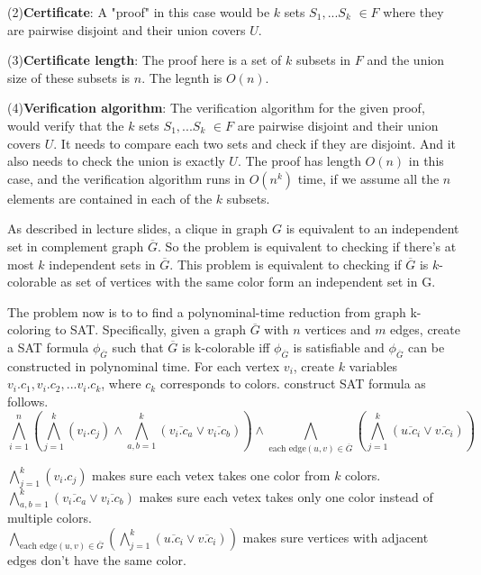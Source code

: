 \documentclass[12pt,a4paper]{article}
\newcommand{\question}[1]{\bigskip\noindent{\textbf{Q{#1} solution}}}
\begin{document}
(2)\textbf{Certificate}: A "proof" in this case would be $k$ sets $S_1, ... S_k$ $\in F$ where they are pairwise disjoint and their union covers $U$.

(3)\textbf{Certificate length}: The proof here is a set of $k$ subsets in $F$ and the union size of these subsets is $n$. The legnth is $O(n)$.

(4)\textbf{Verification algorithm}: The verification algorithm for the given proof, would verify that the $k$ sets $S_1, ... S_k$ $\in F$ are pairwise disjoint and their union covers $U$. It needs to compare each two sets and check if they are disjoint. And it also needs to check the union is exactly $U$. The proof has length $O(n)$ in this case, and the verification algorithm runs in $O(n^k)$ time, if we assume all the $n$ elements are contained in each of the $k$ subsets.

\question{32.A}

As described in lecture slides, a clique in graph $G$ is equivalent to an independent set in complement graph $\overline{G}$. So the problem is equivalent to checking if there's at most $k$ independent sets in $\overline{G}$. This problem is equivalent to checking if $\overline{G}$ is $k$-colorable as set of vertices with the same color form an independent set in G. 

The problem now is to to find a polynominal-time reduction from graph k-coloring to SAT. Specifically, given a graph $\overline{G}$ with $n$ vertices and $m$ edges, create a SAT formula $\phi_{\overline{G}}$ such that $\overline{G}$ is k-colorable iff $\phi_{\overline{G}}$ is satisfiable and $\phi_{\overline{G}}$ can be constructed in polynominal time. For each vertex $v_i$, create $k$ variables $v_i.c_1,v_i.c_2,...v_i.c_k$, where $c_k$ corresponds to colors. construct SAT formula as follows.
\begin{equation*}
	\bigwedge_{i=1}^{n} (\bigwedge_{j=1}^{k}(v_i.c_j) \wedge \bigwedge_{a,b=1}^{k} (\overline{v_i.c_a} \vee \overline{v_i.c_b})) \wedge \bigwedge_{\mbox{each edge} (u,v) \in \overline{G}}( \bigwedge_{j=1}^{k}(\overline{u.c_i} \vee \overline{v.c_i}))
\end{equation*}

\noindent
$\bigwedge_{j=1}^{k}(v_i.c_j)$ makes sure each vetex takes one color from $k$ colors. \\
$\bigwedge_{a,b=1}^{k} (\overline{v_i.c_a} \vee \overline{v_i.c_b})$ makes sure each vetex takes only one color instead of multiple colors. \\
$\bigwedge_{\mbox{each edge} (u,v) \in \overline{G}}( \bigwedge_{j=1}^{k}(\overline{u.c_i} \vee \overline{v.c_i}))$ makes sure vertices with adjacent edges don't have the same color.
\end{document}
